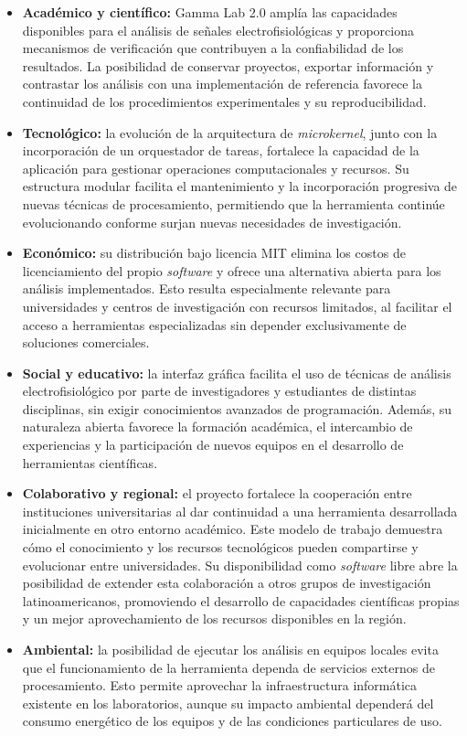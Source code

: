 \documentclass[12pt,letterpaper,oneside]{article}
\begin{document}
\begin{itemize}
  \item \textbf{Académico y científico:} Gamma Lab 2.0 amplía las capacidades disponibles para el análisis de señales electrofisiológicas y proporciona mecanismos de verificación que contribuyen a la confiabilidad de los resultados. La posibilidad de conservar proyectos, exportar información y contrastar los análisis con una implementación de referencia favorece la continuidad de los procedimientos experimentales y su reproducibilidad.
  \item \textbf{Tecnológico:} la evolución de la arquitectura de \textit{microkernel}, junto con la incorporación de un orquestador de tareas, fortalece la capacidad de la aplicación para gestionar operaciones computacionales y recursos. Su estructura modular facilita el mantenimiento y la incorporación progresiva de nuevas técnicas de procesamiento, permitiendo que la herramienta continúe evolucionando conforme surjan nuevas necesidades de investigación.
  \item \textbf{Económico:} su distribución bajo licencia MIT elimina los costos de licenciamiento del propio \textit{software} y ofrece una alternativa abierta para los análisis implementados. Esto resulta especialmente relevante para universidades y centros de investigación con recursos limitados, al facilitar el acceso a herramientas especializadas sin depender exclusivamente de soluciones comerciales.
  \item \textbf{Social y educativo:} la interfaz gráfica facilita el uso de técnicas de análisis electrofisiológico por parte de investigadores y estudiantes de distintas disciplinas, sin exigir conocimientos avanzados de programación. Además, su naturaleza abierta favorece la formación académica, el intercambio de experiencias y la participación de nuevos equipos en el desarrollo de herramientas científicas.
  \item \textbf{Colaborativo y regional:} el proyecto fortalece la cooperación entre instituciones universitarias al dar continuidad a una herramienta desarrollada inicialmente en otro entorno académico. Este modelo de trabajo demuestra cómo el conocimiento y los recursos tecnológicos pueden compartirse y evolucionar entre universidades. Su disponibilidad como \textit{software} libre abre la posibilidad de extender esta colaboración a otros grupos de investigación latinoamericanos, promoviendo el desarrollo de capacidades científicas propias y un mejor aprovechamiento de los recursos disponibles en la región.
  \item \textbf{Ambiental:} la posibilidad de ejecutar los análisis en equipos locales evita que el funcionamiento de la herramienta dependa de servicios externos de procesamiento. Esto permite aprovechar la infraestructura informática existente en los laboratorios, aunque su impacto ambiental dependerá del consumo energético de los equipos y de las condiciones particulares de uso.
\end{itemize}
\end{document}

